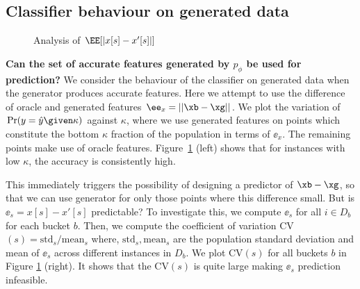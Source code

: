 \documentclass[letterpaper]{article}
\begin{document}
\subsection{Classifier behaviour on generated data}
\begin{figure}[h]
    \centering
        \caption{\small Analysis of $\EE[|x[s]-x'[s]|]$ }
    \label{fig:lm}
\end{figure}
\textbf{Can the set of accurate features generated by $p_{\phi}$ be used for prediction?}
We consider the behaviour of the classifier on generated data when the generator produces accurate features.
Here we attempt to use the difference of oracle and generated features $\ee_x= ||\xb-\xg||$. We plot the variation of $\Pr(y=\hat{y} \given \kappa)$ against $\kappa$, where we use generated features on points which constitute the bottom $\kappa$ fraction of the population in terms of $\ee_x$. The remaining points make use of oracle features. Figure~\ref{fig:lm} (left) shows that for instances with low $\kappa$, the accuracy is consistently high.

This immediately triggers the possibility of designing a predictor of $\xb - \xg$, so that we can use generator for only those points where this difference small. But is  $\ee_s = x[s] - x'[s]$ predictable?  To investigate this, we compute $\ee_s$ for all $i\in D_b$ for each bucket $b$. Then, we compute the coefficient of variation CV$(s) = \text{std}_s/\text{mean}_s$ where,
$\text{std}_s, \text{mean}_s$ are the population standard deviation and mean of $\ee_s$ across different
instances in $ D_b$. We plot CV$(s)$  for all buckets $b$ in Figure \ref{fig:lm} (right). It shows that the CV$(s)$ is quite large making $\ee_s$ prediction infeasible.
\end{document}
